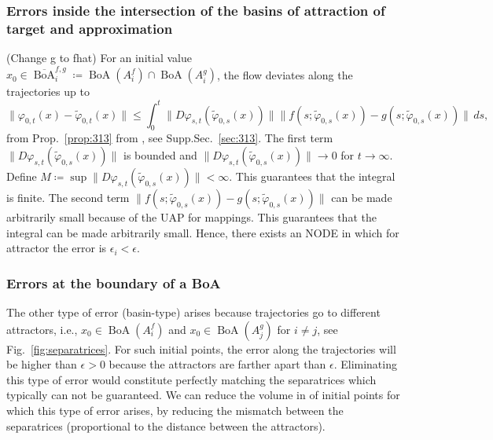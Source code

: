 \documentclass{article}
\newcommand{\ascomment}[1]{\textcolor{ascolor}{(#1)}}
\theoremstyle{definition} \newtheorem{definition}{Definition}
\theoremstyle{remark} \newtheorem{remark}{Remark}
\newcommand{\boa}{\operatorname{BoA}}
\newcounter{ct}
\begin{document}
\subsubsection{Errors inside the intersection of the basins of attraction of target and approximation}\label{sec:inboa_approx}
\ascomment{Change g to fhat}
For an initial value $x_0\in \overline{\boa}_i^{f,g} \coloneqq \boa(A_i^f) \cap \boa(A_i^g)$, the flow deviates along the trajectories up to 
\[
\|\varphi_{0,t}(x) - \tilde{\varphi}_{0,t}(x)\| \leq \int_0^t \|D\varphi_{s,t}(\tilde{\varphi}_{0,s}(x))\| \|f(s; \tilde{\varphi}_{0,s}(x)) - g(s; \tilde{\varphi}_{0,s}(x))\| \, ds,
\]
from Prop.~\ref{prop:313} from \citep{vanhandel2007filtering}, see Supp.Sec.~\ref{sec:313}.
%
%
The first term \(\|D\varphi_{s,t}(\tilde{\varphi}_{0,s}(x))\|\) is bounded %
and \(\|D\varphi_{s,t}(\tilde{\varphi}_{0,s}(x))\|\rightarrow 0\) for \(t\rightarrow\infty\).
Define $M\coloneqq \sup \|D\varphi_{s,t}(\tilde{\varphi}_{0,s}(x))\|<\infty$. 
%
This guarantees that the integral is finite.
%
The second term $\|f(s; \tilde{\varphi}_{0,s}(x)) - g(s; \tilde{\varphi}_{0,s}(x))\|$
can be made arbitrarily small because of the UAP for mappings.
%
This guarantees that the integral can be made arbitrarily small.	
Hence, there exists an NODE in which for attractor the error is $\epsilon_i<\epsilon$. 






\subsubsection{Errors at the boundary of a BoA}\label{sec:boa_errors}%
\label{sec:separatrix_approx}
The other type of error (basin-type) arises because trajectories go to different attractors, i.e., $x_0\in \boa(A_i^f)$ and $x_0\in \boa(A_j^g)$ for $i\neq j$, see Fig.~\ref{fig:separatrices}.
For such initial points, the error along the trajectories will be higher than $\epsilon>0$ because the attractors are farther apart than $\epsilon$.
Eliminating this type of error would constitute perfectly matching the separatrices which typically can not be guaranteed.
We can reduce the volume in of initial points for which this type of error arises, by reducing the mismatch between the separatrices (proportional to the distance between the attractors).
\end{document}

